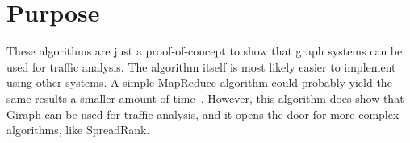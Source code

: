 \section{Purpose}
These algorithms are just a proof-of-concept to show that graph systems can be used for traffic analysis.
The algorithm itself is most likely easier to implement using other systems.
A simple MapReduce algorithm could probably yield the same results a smaller amount of time~\cite{Morken352472}.
However, this algorithm does show that Giraph can be used for traffic analysis,
 and it opens the door for more complex algorithms, like SpreadRank.


